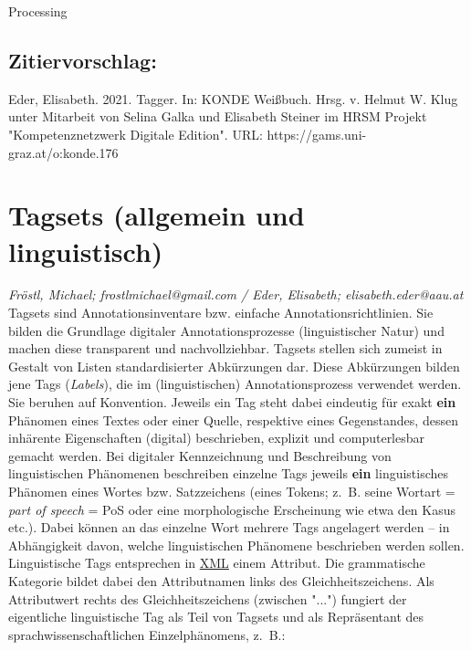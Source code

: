 \documentclass{article}
\begin{document}
Processing\subsection*{Zitiervorschlag:}Eder, Elisabeth. 2021. Tagger. In: KONDE Weißbuch. Hrsg. v. Helmut W. Klug unter Mitarbeit von Selina Galka und Elisabeth Steiner im HRSM Projekt "Kompetenznetzwerk Digitale Edition". URL: https://gams.uni-graz.at/o:konde.176\newpage\section*{Tagsets (allgemein und linguistisch)} \emph{Fröstl, Michael; frostlmichael@gmail.com / Eder, Elisabeth; elisabeth.eder@aau.at}\\
        
    Tagsets sind Annotationsinventare bzw. einfache Annotationsrichtlinien. Sie bilden
                  die Grundlage digitaler Annotationsprozesse (linguistischer Natur) und machen
                  diese transparent und nachvollziehbar. Tagsets stellen sich zumeist in Gestalt von
                  Listen standardisierter Abkürzungen dar. Diese Abkürzungen bilden jene Tags (\emph{Labels}), die im (linguistischen) Annotationsprozess
                  verwendet werden. Sie beruhen auf Konvention. Jeweils ein Tag steht dabei
                  eindeutig für exakt \textbf{ein}  Phänomen eines Textes oder einer
                  Quelle, respektive eines Gegenstandes, dessen inhärente Eigenschaften (digital)
                  beschrieben, explizit und computerlesbar gemacht werden. Bei digitaler
                  Kennzeichnung und Beschreibung von linguistischen Phänomenen beschreiben einzelne
                  Tags jeweils \textbf{ein}  linguistisches Phänomen eines Wortes bzw.
                  Satzzeichens (eines Tokens; z. B. seine Wortart = \emph{part of
                     speech} = PoS oder eine morphologische Erscheinung wie etwa den Kasus
                  etc.). Dabei können an das einzelne Wort mehrere Tags angelagert werden – in
                  Abhängigkeit davon, welche linguistischen Phänomene beschrieben werden sollen.
                  Linguistische Tags entsprechen in \href{http://gams.uni-graz.at/o:konde.215}{XML} einem Attribut. Die grammatische Kategorie bildet dabei den
                  Attributnamen links des Gleichheitszeichens. Als Attributwert rechts des
                  Gleichheitszeichens (zwischen "...") fungiert der eigentliche linguistische Tag
                  als Teil von Tagsets und als Repräsentant des sprachwissenschaftlichen
                  Einzelphänomens, z. B.: \\
            
\end{document}
